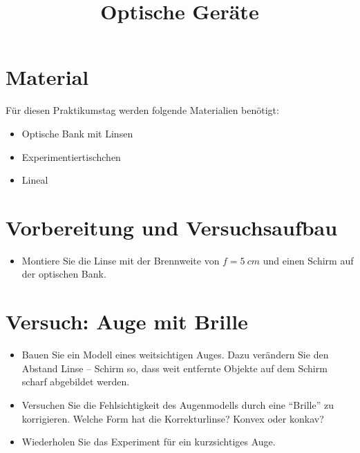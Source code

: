 \documentclass[12pt,a4paper, twosite]{article}
\author{}
\date{}
\title{Optische Geräte}
\begin{document}
\maketitle

\section*{Material}
Für diesen Praktikumstag werden folgende Materialien benötigt:
\begin{itemize}
	\item Optische Bank mit Linsen 
	\item Experimentiertischchen
	\item Lineal
\end{itemize}

\section*{Vorbereitung und Versuchsaufbau}

\begin{itemize}
	\item Montiere Sie die Linse mit der Brennweite von $f=\SI{5}{cm}$ und einen Schirm auf der optischen Bank.
\end{itemize}


%	



\section*{Versuch: Auge mit Brille}
\begin{itemize}
	\item Bauen Sie ein Modell eines weitsichtigen Auges. Dazu verändern Sie den Abstand 
		Linse -- Schirm so, dass weit entfernte Objekte auf dem Schirm scharf abgebildet werden.
	\item Versuchen Sie die Fehlsichtigkeit des Augenmodells durch eine ``Brille'' zu korrigieren.
		Welche Form hat die Korrekturlinse? Konvex oder konkav?
	\item Wiederholen Sie das Experiment für ein kurzsichtiges Auge.
\end{itemize}
\end{document}
